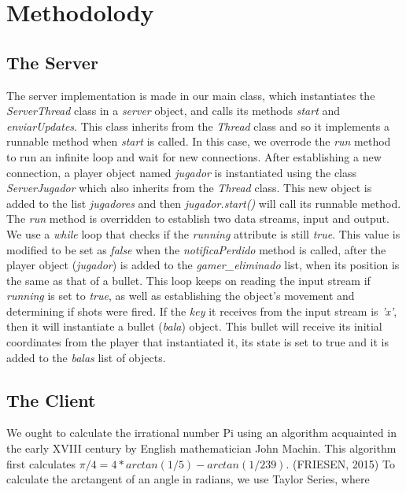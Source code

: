 \documentclass[10pt,a4paper]{article}
\theoremstyle{definition}
\begin{document}
\section{Methodolody}
\subsection{The Server}
The server implementation is made in our main class, which instantiates the \textit{ServerThread} class in a \textit{server} object, and calls its methods \textit{start} and \textit{enviarUpdates}. 
This class inherits from the \textit{Thread} class and so it implements a runnable method when \textit{start} is called. 
In this case, we overrode the \textit{run} method to run an infinite loop and wait for new connections. 
After establishing a new connection, a player object named \textit{jugador} is instantiated using the class \textit{ServerJugador} which also inherits from the \textit{Thread} class. 
This new object is added to the list \textit{jugadores} and then \textit{jugador.start()} will call its runnable method. 
The \textit{run} method is overridden to establish two data streams, input and output. 
We use a \textit{while} loop that checks if the \textit{running} attribute is still \textit{true}. 
This value is modified to be set as \textit{false} when the \textit{notificaPerdido} method is called, after the player object (\textit{jugador}) is added to the \textit{gamer\_eliminado} list, when its position is the same as that of a bullet. 
This loop keeps on reading the input stream if \textit{running} is set to \textit{true}, as well as establishing the object's movement and determining if shots were fired. 
If the \textit{key} it receives from the input stream is \textit{'x'}, then it will instantiate a bullet (\textit{bala}) object. 
This bullet will receive its initial coordinates from the player that instantiated it, its state is set to true and it is added to the \textit{balas} list of objects. 


\subsection{The Client}
We ought to calculate the irrational number Pi using an algorithm acquainted in the early XVIII century by English mathematician John Machin. This algorithm first calculates \(\pi/4 = 4 * arctan(1/5) - arctan(1/239)\). (FRIESEN, 2015)\cite{FRIESEN2015} To calculate the arctangent of an angle in radians, we use Taylor Series, where\\
\end{document}
